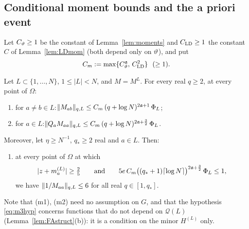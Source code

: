 \subsection{Conditional moment bounds and the a priori event}\label{sec:FAmom}
Let $C_\vartheta\ge1$ be the constant of Lemma~\ref{lem:moments} and $C_{\rm LD}\ge1$ the constant $C$ of Lemma~\ref{lem:LDmom} (both depend only on $\vartheta$), and put
\begin{equation}\label{eq:Cm}
 C_m:=\max\{C_\vartheta^{\mathfrak{a}},\,C_{\rm LD}^2\}\ \ (\ge1).
\end{equation}

\begin{lemma}\label{lem:FAmom}
Let $L\subset\{1,\dots,N\}$, $1\le|L|<N$, and $M=M^L$. For every real $q\ge2$, at every point of $\Omega$:
\begin{enumerate}[label=\textup{(m\arabic*)},leftmargin=2.8em,itemsep=1pt]
\item for $a\ne b\in L$:\quad $\|M_{ab}\|_{q,L}\le C_m\,(q+\log N)^{2\mathfrak{a}+1}\,\Phi_L$;
\item for $a\in L$:\quad $\|Q_aM_{aa}\|_{q,L}\le C_m\,(q+\log N)^{2\mathfrak{a}+\frac32}\,\Phi_L$.
\end{enumerate}
Moreover, let $\eta\ge N^{-1}$, $q_*\ge2$ real and $a\in L$. Then:
\begin{enumerate}[label=\textup{(m\arabic*)},leftmargin=2.8em,itemsep=1pt,start=3]
\item at every point of $\Omega$ at which
\begin{equation}\label{eq:m3hyp}
 |z+m_a^{(L)}|\ge\tfrac25\qquad\text{and}\qquad5e\,C_m\big((q_*+1)\lceil\log N\rceil\big)^{2\mathfrak{a}+\frac32}\,\Phi_L\le1,
\end{equation}
we have $\|1/M_{aa}\|_{q,L}\le6$ for all real $q\in[1,q_*]$.
\end{enumerate}
\end{lemma}
\noindent Note that (m1), (m2) need no assumption on $G$, and that the hypothesis \eqref{eq:m3hyp} concerns functions that do not depend on $\mathcal Q(L)$ (Lemma~\ref{lem:FAstruct}(b)): it is a condition on the minor $H^{(L)}$ only.

